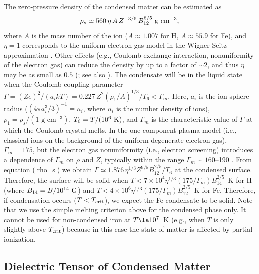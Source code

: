\documentclass{emulateapj}
\newcommand{\be}{\begin{equation}}
\newcommand{\ee}{\end{equation}}
\begin{document}
The zero-pressure density of the condensed matter can be estimated as
\be
\rho_s \simeq 560\,\eta\,A\,Z^{-3/5}\,B^{6/5}_{12}~{\rm g~cm}^{-3},
\label{rho_s}
\ee
where $A$ is the mass number of the ion ($A\approx 1.007$ for H,
$A\approx 55.9$ for Fe), and 
$\eta=1$ corresponds to the uniform electron gas model in the
Wigner-Seitz approximation \citep{Kadomtsev}. Other effects 
(e.g., Coulomb exchange interaction, nonuniformity of the electron gas)
can reduce the density by up to a factor of $\sim 2$, and thus $\eta$ may be
as small as $0.5$ 
(\citealt{Lai01}; see also \citealt{PC04}). 
The condensate will be in the liquid state when the Coulomb coupling parameter
$\Gamma=(Ze)^2/(a_ikT) =0.227\,Z^2 (\rho_1/A)^{1/3} /T_6 < \Gamma_m$. 
Here, $a_i$ is the ion sphere radius ($(4\pi a_i^3/3)^{-1}=n_i$, where
 $n_i$ is the number density of ions),
 $\rho_1=\rho_s/(1\mbox{ g cm}^{-3})$,
$T_6=T/(10^6~{\rm K})$, and $\Gamma_m$ is the characteristic
value of $\Gamma$ at which the Coulomb crystal melts. In the one-component plasma model 
(i.e., classical ions on the background of the uniform degenerate electron gas),
$\Gamma_m = 175$, but the electron gas nonuniformity (i.e., electron
screening) introduces a dependence of  $\Gamma_m$
on $\rho$ and $Z$, typically within the range 
$\Gamma_m\sim160$--190 \citep{PC00}. From 
equation (\ref{rho_s}) we obtain $\Gamma\simeq1.876\,\eta^{1/3}Z^{9/5}B_{12}^{2/5}/T_6$
at the condensed surface. Therefore, the surface will be solid  
when $T < 7\times 10^4\eta^{1/3}(175/\Gamma_m)B_{14}^{2/5}$~K 
for H (where $B_{14}=B/10^{14}~{\rm G}$) 
and $T < 4\times 10^6\eta^{1/3}(175/\Gamma_m)B_{12}^{2/5}$~K for Fe.  
Therefore, if condensation occurs ($T < T_{\rm crit}$), we expect the Fe
condensate to be solid.
Note that we use the 
simple melting criterion above for the condensed phase only.  It cannot be used for 
non-condensed iron at $T\la 10^7$~K (e.g., when $T$ is only slightly above 
$T_{\rm crit}$)
because in this case the state of matter is affected by partial ionization.

\subsection{Dielectric Tensor of Condensed Matter}
\label{sect:DielTens}
\end{document}
